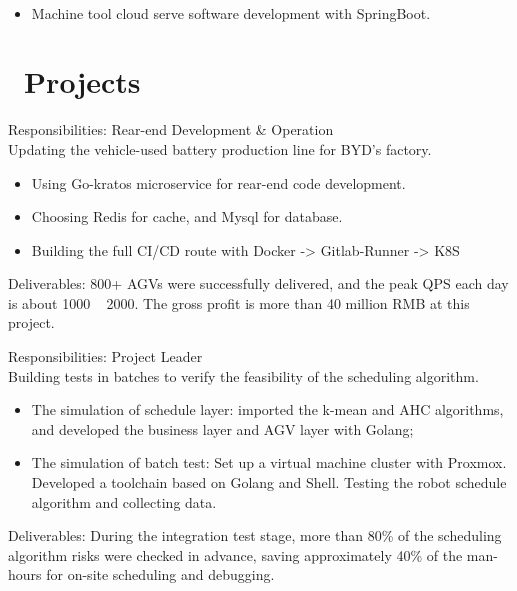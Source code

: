 \documentclass[a4paper,10pt]{resume}
\begin{document}
\\
\begin{itemize}[parsep=0.5ex]
  \item Machine tool cloud serve software development with SpringBoot.
\end{itemize}

\section{\faFile\ Projects}
Responsibilities: Rear-end Development \& Operation
\\Updating the vehicle-used battery production line for BYD's factory.
\begin{itemize}[parsep=0.5ex]
  \item Using Go-kratos microservice for rear-end code development.
  \item Choosing Redis for cache, and Mysql for database.
  \item Building the full CI/CD route with Docker -> Gitlab-Runner -> K8S
\end{itemize}
Deliverables: 800+ AGVs were successfully delivered, and the peak QPS each day is about 1000 ~ 2000. The gross profit is more than 40 million RMB at this project.


Responsibilities: Project Leader
\\Building tests in batches to verify the feasibility of the scheduling algorithm.
\begin{itemize}[parsep=0.5ex]
  \item The simulation of schedule layer: imported the k-mean and AHC algorithms, and developed the business layer and AGV layer with Golang;
  \item The simulation of batch test: Set up a virtual machine cluster with Proxmox. Developed a toolchain based on Golang and Shell. Testing the robot schedule algorithm and collecting data.
\end{itemize}
Deliverables: During the integration test stage, more than 80\% of the scheduling algorithm risks were checked in advance, saving approximately 40\% of the man-hours for on-site scheduling and debugging.
\end{document}
